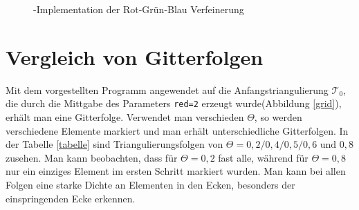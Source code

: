 \begin{figure}[!htbp]
	
	\caption{\label{redref} \matlab-Implementation der Rot-Grün-Blau Verfeinerung}
\end{figure}
\newpage \newpage \newpage  
\section{Vergleich von Gitterfolgen}
Mit dem vorgestellten \matlab \:Programm angewendet auf die Anfangstriangulierung $\mathscr{T}_0$, die durch die Mittgabe des Parameters \texttt{red=2} erzeugt wurde(Abbildung \ref{grid}), erhält man eine Gitterfolge. Verwendet man verschieden $\Theta$, so werden verschiedene Elemente markiert und man erhält unterschiedliche Gitterfolgen. In der Tabelle \ref{tabelle} sind Triangulierungsfolgen von $\Theta =0,2/0,4/0,5/0,6 \text{ und } 0,8$ zusehen. Man kann beobachten, dass für $\Theta = 0,2$ fast alle, während für $\Theta = 0,8$ nur ein einziges Element im ersten Schritt markiert wurden. Man kann bei allen Folgen eine starke Dichte an Elementen in den Ecken, besonders der einspringenden Ecke erkennen.\\
